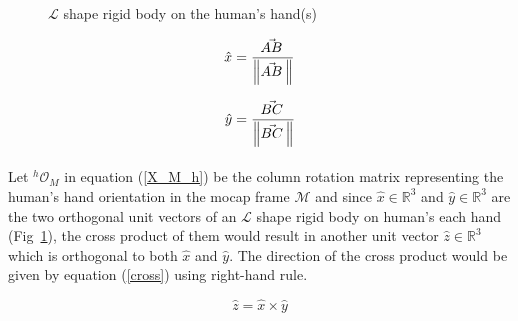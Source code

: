 \begin{figure}[ht]
	\caption{$\mathcal{L}$ shape rigid body on the human's hand(s)}
	\label{fig:lshapes}
\end{figure}

\begin{equation*}
\hat{x} = \frac{\vec{AB}^{\,}}{\norm{\vec{AB}^{\,}}}
\end{equation*}

\begin{equation*}
\hat{y} = \frac{\vec{BC}^{\,}}{\norm{\vec{BC}^{\,}}}
\end{equation*}

\paragraph*{}
Let ${}^{h}\mathcal{O}_{M}$ in equation (\ref{X_M_h}) be the column rotation matrix representing the human's hand orientation in the mocap frame $\mathcal{M}$ and since $\hat{x} \in \mathbb{R}^{3}$ and $\hat{y} \in \mathbb{R}^{3}$ are the two orthogonal unit vectors of an $\mathcal{L}$ shape rigid body on human's each hand (Fig~\ref{fig:lshapes}), the cross product of them would result in another unit vector $\hat{z} \in \mathbb{R}^{3}$ which is orthogonal to both $\hat{x}$ and $\hat{y}$. The direction of the cross product would be given by equation (\ref{cross}) using right-hand rule.


\begin{equation}\label{cross}
\hat{z} = \hat{x} \times \hat{y}
\end{equation}


